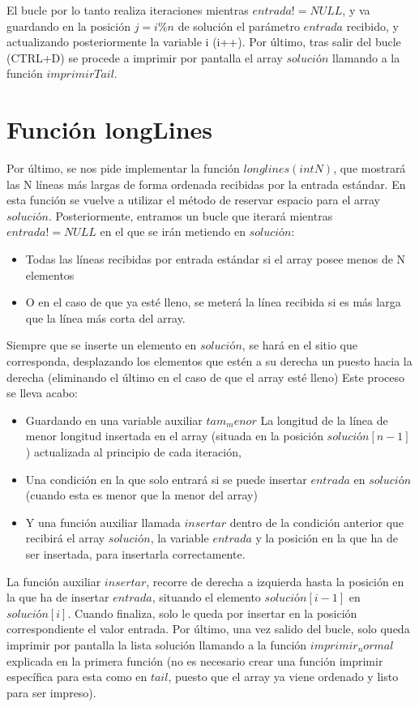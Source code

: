 El bucle por lo tanto realiza iteraciones mientras $entrada != NULL$, y va guardando en la posición $j=i\%n$ de solución el parámetro $entrada$ recibido, y actualizando posteriormente la variable i (i++).
Por último, tras salir del bucle (CTRL+D) se procede a imprimir por pantalla el array $solución$ llamando a la función $imprimirTail$.
\section{Función longLines}
Por último, se nos pide implementar la función $longlines(int N)$, que mostrará las N líneas más largas de forma ordenada recibidas por la entrada estándar.
En esta función se vuelve a utilizar el método de reservar espacio para el array $solución$. Posteriormente, entramos un bucle que iterará mientras $entrada != NULL$ en el que se irán metiendo en $solución$:
\begin{itemize}
\item Todas las líneas recibidas por entrada estándar si el array posee menos de N elementos
\item O en el caso de que ya esté lleno, se meterá la línea recibida si es más larga que la línea más corta del array.
\end{itemize}
Siempre que se inserte un elemento en $solución$, se hará en el sitio que corresponda, desplazando los elementos que estén a su derecha un puesto hacia la derecha (eliminando el último en el caso de que el array esté lleno)
Este proceso se lleva acabo:
\begin{itemize}
\item Guardando en una variable auxiliar $tam_menor$ La longitud de la línea de menor longitud insertada en el array (situada en la posición $solución[n-1]$) actualizada al principio de cada iteración,
\item Una condición en la que solo entrará si se puede insertar $entrada$ en $solución$ (cuando esta es menor que la menor del array)
\item Y una función auxiliar llamada $insertar$ dentro de la condición anterior que recibirá el array $solución$, la variable $entrada$ y la posición en la que ha de ser insertada, para insertarla correctamente.
\end{itemize}
La función auxiliar $insertar$, recorre de derecha a izquierda hasta la posición en la que ha de insertar $entrada$, situando el elemento $solución[i-1]$ en $solución[i]$. Cuando finaliza, solo le queda por insertar en la posición correspondiente el valor entrada.
Por último, una vez salido del bucle, solo queda imprimir por pantalla la lista solución llamando a la función $imprimir_normal$ explicada en la primera función (no es necesario crear una función imprimir específica para esta como en $tail$, puesto que el array ya viene ordenado y listo para ser impreso).
